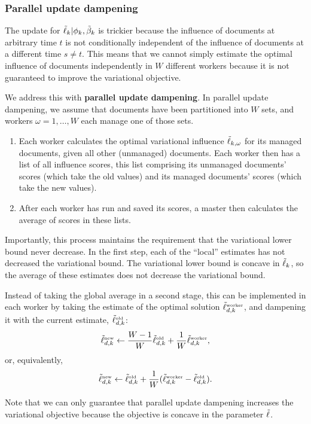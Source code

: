 \subsubsection*{Parallel update dampening}

The update for $\tilde{\ell}_{k} | \phi_k, \tilde{\beta}_k$ is trickier because the
influence of documents at arbitrary time $t$ is not conditionally
independent of the influence of documents at a different time $s \neq
t$.  This means that we cannot simply estimate the optimal influence
of documents independently in $W$ different workers because it is not
guaranteed to improve the variational objective.

We address this with \textbf{parallel update dampening}.  In parallel
update dampening, we assume that documents have been partitioned into
$W$ sets, and workers $\omega = 1, \ldots, W$ each manage one of those
sets.

\begin{enumerate}
\item Each worker calculates the optimal variational influence
  $\tilde{\ell}_{k,\omega}$ for its managed documents, given all other
  (unmanaged) documents.  Each worker then has a list of all influence
  scores, this list comprising its unmanaged documents' scores (which take the
  old values) and its managed documents' scores (which take the new
  values).
  
\item After each worker has run and saved its scores, a master then
  calculates the average of scores in these lists.
\end{enumerate}
Importantly, this process maintains the requirement that the
variational lower bound never decrease.  In the first step, each of
the ``local'' estimates has not decreased the variational bound.  The
variational lower bound is concave in $\tilde{\ell}_{k}$, so the average of
these estimates does not decrease the variational bound.

Instead of taking the global average in a second stage, this can be
implemented in each worker by taking the estimate of the optimal
solution $\tilde{\ell}^{\mbox{\tiny worker}}_{d,k}$, and dampening it with
the current estimate, $\tilde{\ell}^{\mbox{\tiny old}}_{d,k}$:
 \[
  \tilde{\ell}^{\mbox{\tiny new}}_{d,k} \gets \frac{W - 1}{W} \tilde{\ell}^{\mbox{\tiny old}}_{d,k} + \frac{1}{W} \tilde{\ell}^{\mbox{\tiny worker}}_{d,k},
\]
or, equivalently,
 \[
 \tilde{\ell}^{\mbox{\tiny new}}_{d,k} \gets \tilde{\ell}^{\mbox{\tiny old}}_{d,k} + \frac{1}{W} (\tilde{\ell}^{\mbox{\tiny worker}}_{d,k} - \tilde{\ell}^{\mbox{\tiny old}}_{d,k}).
\]

Note that we can only guarantee that parallel update dampening
increases the variational objective because the objective is concave
in the parameter $\tilde{\ell}$.
